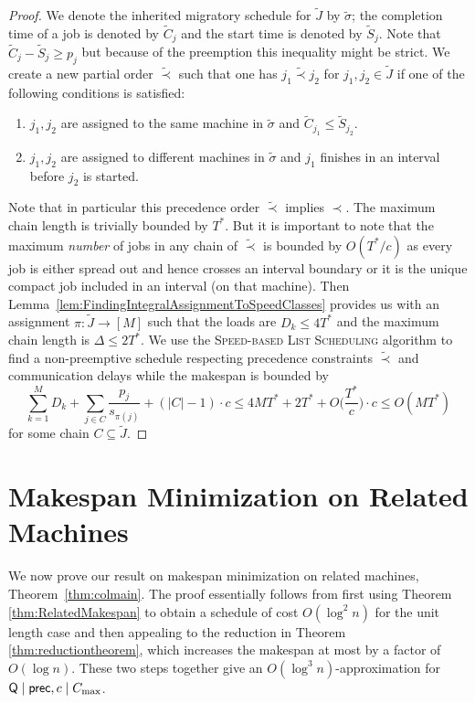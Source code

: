 \begin{proof}
    We denote the inherited migratory schedule for $\tilde{J}$ by $\tilde{\sigma}$; the completion time of a job is denoted by $\tilde{C}_j$ and the start time is denoted by $\tilde{S}_j$. Note that $\tilde{C}_j - \tilde{S}_j \geq p_j$
    but because of the preemption this inequality might be strict.
    We create a new partial order $\tilde{\prec}$ such that one has $j_1 \tilde{\prec} j_2$ for $j_1,j_2 \in \tilde{J}$ if one of the following conditions is satisfied:
    \begin{enumerate}
    \item $j_1,j_2$ are assigned to the same machine in $\tilde{\sigma}$ and $\tilde{C}_{j_1} \leq \tilde{S}_{j_2}$.
    \item $j_1,j_2$ are assigned to different machines in $\tilde{\sigma}$ and $j_1$ finishes in an interval before $j_2$ is started.
    \end{enumerate}
    Note that in particular this precedence order $\tilde{\prec}$ implies $\prec$. The maximum chain length
    is trivially bounded by $T^*$. But it is important to note that the maximum \emph{number} of jobs in
    any chain of $\tilde{\prec}$ is bounded by $O(T^*/c)$ as every job is either spread out and hence crosses an interval boundary or it is the unique compact job included in an interval (on that machine).
    Then Lemma~\ref{lem:FindingIntegralAssignmentToSpeedClasses} provides us with an assignment $\pi : \tilde{J} \to [M]$ such that the loads are $D_k \leq 4T^*$ and the maximum chain length is $\Delta \leq 2T^*$.
    We use the \textsc{Speed-based List Scheduling} algorithm to find a non-preemptive schedule respecting precedence constraints $\tilde{\prec}$ and communication delays while the makespan is bounded by
    \[
     \sum_{k=1}^M D_k + \sum_{j \in C} \frac{p_j}{s_{\pi(j)}} + (|C|-1) \cdot c \leq 4MT^* + 2T^* + O\Big(\frac{T^*}{c}\Big) \cdot c \leq O(MT^*) 
    \]
  for some chain $C \subseteq \tilde{J}$.
  \end{proof}
  
  \section{Makespan Minimization on Related Machines}
  \label{sec:makespanformalproof}
  We now prove our result on makespan minimization on related machines, Theorem~\ref{thm:colmain}.
  The proof essentially follows from first using Theorem \ref{thm:RelatedMakespan} to obtain a schedule of cost $O(\log^2 n)$ for the unit length case and then appealing to the reduction in Theorem \ref{thm:reductiontheorem}, which increases the makespan at most by a factor of $O(\log n)$.  These two steps together give an $O(\log^3 n)$-approximation for  $\mathsf{Q} \mid \mathsf{prec}, c \mid C_{\max}$. 
  
